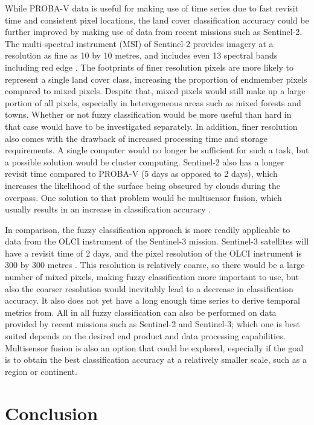 \documentclass[a4paper,12pt]{scrbook}
\begin{document}
While PROBA-V data is useful for making use of time series due to fast revisit time and consistent pixel locations, the land cover classification accuracy could be further improved by making use of data from recent missions such as Sentinel-2. The multi-spectral instrument (MSI) of Sentinel-2 provides imagery at a resolution as fine as 10 by 10 metres, and includes even 13 spectral bands including red edge \citep{gatti2016sentinel2}. The footprints of finer resolution pixels are more likely to represent a single land cover class, increasing the proportion of endmember pixels compared to mixed pixels. Despite that, mixed pixels would still make up a large portion of all pixels, especially in heterogeneous areas such as mixed forests and towns. Whether or not fuzzy classification would be more useful than hard in that case would have to be investigated separately. In addition, finer resolution also comes with the drawback of increased processing time and storage requirements. A single computer would no longer be sufficient for such a task, but a possible solution would be cluster computing. Sentinel-2 also has a longer revisit time compared to PROBA-V (5 days as opposed to 2 days), which increases the likelihood of the surface being obscured by clouds during the overpass. One solution to that problem would be multisensor fusion, which usually results in an increase in classification accuracy \citep{yu2014metadiscoveries}.

In comparison, the fuzzy classification approach is more readily applicable to data from the OLCI instrument of the Sentinel-3 mission. Sentinel-3 satellites will have a revisit time of 2 days, and the pixel resolution of the OLCI instrument is 300 by 300 metres \citep{Donlon2012sentinel3}. This resolution is relatively coarse, so there would be a large number of mixed pixels, making fuzzy classification more important to use, but also the coarser resolution would inevitably lead to a decrease in classification accuracy. It also does not yet have a long enough time series to derive temporal metrics from. All in all fuzzy classification can also be performed on data provided by recent missions such as Sentinel-2 and Sentinel-3; which one is best suited depends on the desired end product and data processing capabilities. Multisensor fusion is also an option that could be explored, especially if the goal is to obtain the best classification accuracy at a relatively smaller scale, such as a region or continent.

\chapter{Conclusion}
\end{document}
